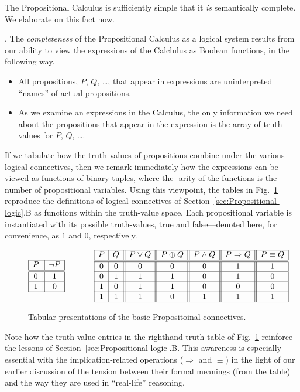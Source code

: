 The Propositional Calculus is sufficiently simple that it {\em is}
semantically complete.  We elaborate on this fact now.

\bigskip

.
The {\em completeness} of the Propositional Calculus as a logical
system results from our ability to view the expressions of the
Calclulus as Boolean functions, in the following way.
\begin{itemize}
\item
All propositions, $P$, $Q$, \ldots, that appear in expressions are
uninterpreted ``names'' of actual propositions.
\item
As we examine an expressions in the Calculus, the only information we
need about the propositions that appear in the expression is the array
of truth-values for $P$, $Q$, \ldots.
\end{itemize}
If we tabulate how the truth-values of propositions combine under the
various logical connectives, then we remark immediately how the
expressions can be viewed as functions of binary tuples, where the
-arity of the functions is the number of propositional variables.
Using this viewpoint, the tables in Fig.~\ref{fig:defns-via-tables}
reproduce the definitions of logical connectives of
Section~\ref{sec:Propositional-logic}.B as functions within the
truth-value space.  Each propositional variable is instantiated with
its possible truth-values, {\sc true} and {\sc false}---denoted here,
for convenience, as $1$ and $0$, respectively.
\begin{figure}[hbt]
\[
\begin{array}{|c||c|}
\hline
P & \neg P \\
\hline
\hline
0 & 1 \\
\hline
1 & 0 \\
\hline
\end{array}
\hspace*{.5in}
\begin{array}{|c|c||c||c||c||c||c|}
\hline
P & Q & P \vee Q  & P \oplus Q & P \wedge Q & P \Rightarrow Q & P \equiv Q  \\
\hline
\hline
0 & 0 & 0 & 0 & 0 & 1 & 1 \\
\hline
0 & 1 & 1 & 1 & 0 & 1 & 0 \\
\hline
1 & 0 & 1 & 1 & 0 & 0 & 0 \\
\hline
1 & 1 & 1 & 0 & 1 & 1 & 1 \\
\hline
\end{array}
\]
\caption{Tabular presentations of the basic Propositoinal connectives.
\label{fig:defns-via-tables}}
\end{figure}
Note how the truth-value entries in the righthand truth table of
Fig.~\ref{fig:defns-via-tables} reinforce the lessons of
Section~\ref{sec:Propositional-logic}.B.  This awareness is especially
essential with the implication-related operations ($\Rightarrow$ and
$\equiv$) in the light of our earlier discussion of the tension
between their formal meanings (from the table) and the way they are
used in ``real-life'' reasoning.

